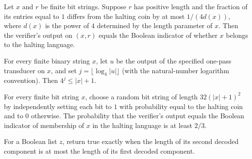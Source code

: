 \begin{theorem}
\label{Randomized.haltCoinVerifier_eq}
\leanok
{}
Let $x$ and $r$ be finite bit strings. Suppose $r$ has positive length and the fraction
of its entries equal to $1$ differs from the halting coin by at most $1/(4d(x))$, where
$d(x)$ is the power of $4$ determined by the length parameter of $x$. Then the
verifier's output on $(x,r)$ equals the Boolean indicator of whether $x$ belongs to the
halting language.
\end{theorem}

\begin{theorem}
\label{Randomized.hlD_le}
\leanok
{}
For every finite binary string $x$, let $u$ be the output of the specified one-pass
transducer on $x$, and set $j=\lfloor\log_4 |u|\rfloor$ (with the natural-number
logarithm convention). Then $4^j\le |x|+1$.
\end{theorem}

\begin{theorem}
\label{Randomized.haltCoinVerifier_prob}
\leanok
{}
For every finite bit string $x$, choose a random bit string of length $32(|x|+1)^2$ by
independently setting each bit to $1$ with probability equal to the halting coin and to
$0$ otherwise. The probability that the verifier's output equals the Boolean indicator
of membership of $x$ in the halting language is at least $2/3$.
\end{theorem}

\begin{definition}
\label{Randomized.lenLeB}
\leanok
{}
For a Boolean list $z$, return true exactly when the length of its second decoded
component is at most the length of its first decoded component.
\end{definition}

